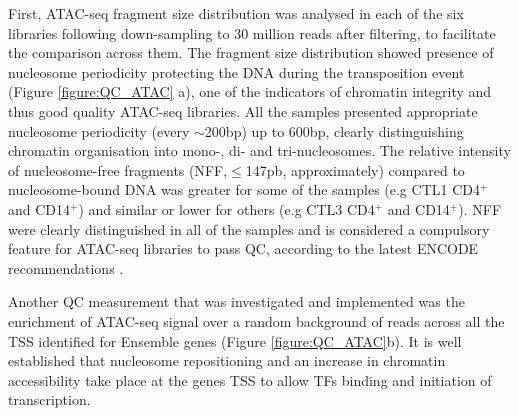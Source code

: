 First, ATAC-seq fragment size distribution was analysed in each of the six libraries following down-sampling to 30 million reads after filtering, to facilitate the comparison across them. The fragment size distribution showed presence of nucleosome periodicity protecting the DNA during the transposition event (Figure \ref{figure:QC_ATAC} a), one of the indicators of chromatin integrity and thus good quality ATAC-seq libraries. All the samples presented appropriate nucleosome periodicity (every $\sim$200bp) up to 600bp, clearly distinguishing chromatin organisation into mono-, di- and tri-nucleosomes. The relative intensity of nucleosome-free fragments (NFF,$\leq$147pb, approximately) compared to nucleosome-bound DNA was greater for some of the samples (e.g CTL1 CD4$^+$ and CD14$^+$) and similar or lower for others (e.g CTL3 CD4$^+$ and CD14$^+$). NFF were clearly distinguished in all of the samples and is considered a compulsory feature for ATAC-seq libraries to pass QC, according to the latest ENCODE recommendations \parencite{ENCODE}.

Another QC measurement that was investigated and implemented was the enrichment of ATAC-seq signal over a random background of reads across all the TSS identified for Ensemble genes (Figure \ref{figure:QC_ATAC}b). It is well established that nucleosome repositioning and an increase in chromatin accessibility take place at the genes TSS to allow TFs binding and initiation of transcription.

